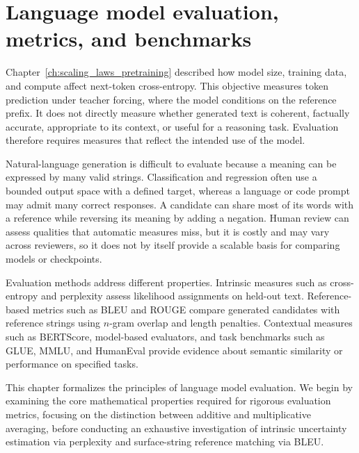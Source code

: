 \documentclass[../../main.tex]{subfiles}
\begin{document}
\chapter{Language model evaluation, metrics, and benchmarks}
\label{ch:evaluation_metrics_benchmarks}

Chapter~\ref{ch:scaling_laws_pretraining} described how model size, training data, and compute affect next-token cross-entropy. This objective measures token prediction under teacher forcing, where the model conditions on the reference prefix. It does not directly measure whether generated text is coherent, factually accurate, appropriate to its context, or useful for a reasoning task. Evaluation therefore requires measures that reflect the intended use of the model.

Natural-language generation is difficult to evaluate because a meaning can be expressed by many valid strings. Classification and regression often use a bounded output space with a defined target, whereas a language or code prompt may admit many correct responses. A candidate can share most of its words with a reference while reversing its meaning by adding a negation. Human review can assess qualities that automatic measures miss, but it is costly and may vary across reviewers, so it does not by itself provide a scalable basis for comparing models or checkpoints.

Evaluation methods address different properties. Intrinsic measures such as cross-entropy and perplexity assess likelihood assignments on held-out text. Reference-based metrics such as BLEU and ROUGE compare generated candidates with reference strings using $n$-gram overlap and length penalties. Contextual measures such as BERTScore, model-based evaluators, and task benchmarks such as GLUE, MMLU, and HumanEval provide evidence about semantic similarity or performance on specified tasks.

This chapter formalizes the principles of language model evaluation. We begin by examining the core mathematical properties required for rigorous evaluation metrics, focusing on the distinction between additive and multiplicative averaging, before conducting an exhaustive investigation of intrinsic uncertainty estimation via perplexity and surface-string reference matching via BLEU.
\end{document}
